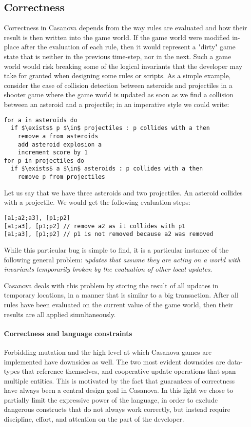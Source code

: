 \subsection{Correctness} 
Correctness in Casanova depends from the way rules are evaluated and how their result is then written into the game world. If the game world were modified in-place after the evaluation of each rule, then it would represent a "dirty" game state that is neither in the previous time-step, nor in the next. Such a game world would risk breaking some of the logical invariants that the developer may take for granted when designing some rules or scripts. As a simple example, consider the case of collision detection between asteroids and projectiles in a shooter game where the game world is updated as soon as we find a collision between an asteroid and a projectile; in an imperative style we could write:

\begin{lstlisting}
for a in asteroids do
  if $\exists$ p $\in$ projectiles : p collides with a then
    remove a from asteroids
    add asteroid explosion a
    increment score by 1
for p in projectiles do
  if $\exists$ a $\in$ asteroids : p collides with a then
    remove p from projectiles
\end{lstlisting}

Let us say that we have three asteroids and two projectiles. An asteroid collides with a projectile. We would get the following evaluation steps:

\begin{lstlisting}
[a1;a2;a3], [p1;p2]
[a1;a3], [p1;p2] // remove a2 as it collides with p1
[a1;a3], [p1;p2] // p1 is not removed because a2 was removed
\end{lstlisting}

While this particular bug is simple to find, it is a particular instance of the following general problem: \textsl{updates that assume they are acting on a world with invariants temporarily broken by the evaluation of other local updates}.

Casanova deals with this problem by storing the result of all updates in temporary locations, in a manner that is similar to a big transaction. After all rules have been evaluated on the current value of the game world, then their results are all applied simultaneously.


\paragraph{Correctness and language constraints} 
Forbidding mutation and the high-level at which Casanova games are implemented have downsides as well. The two most evident downsides are data-types that reference themselves, and cooperative update operations that span multiple entities. This is motivated by the fact that guarantees of correctness have always been a central design goal in Casanova. In this light we chose to partially limit the expressive power of the language, in order to exclude dangerous constructs that do not always work correctly, but instead require discipline, effort, and attention on the part of the developer.

